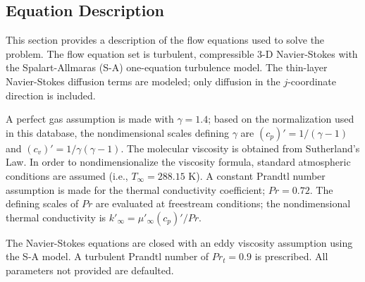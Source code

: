 \subsection{Equation Description}

This section provides a description of the flow equations used to solve
the problem.  The flow equation set is turbulent, compressible 3-D
Navier-Stokes with the Spalart-Allmaras (S-A) one-equation turbulence
model.  The thin-layer Navier-Stokes diffusion terms are modeled; only
diffusion in the $j$-coordinate direction is included.

A perfect gas assumption is made with $\gamma = 1.4$; based on the
normalization used in this database, the nondimensional scales defining
$\gamma$ are $(c_p)' = 1/(\gamma - 1)$ and $(c_v)' = 1/\gamma(\gamma - 1)$.
The molecular viscosity is obtained from Sutherland's Law.
In order to nondimensionalize the viscosity formula, standard atmospheric
conditions are assumed (i.e., $T_\infty = 288.15$ K).
A constant Prandtl number assumption is made for the thermal conductivity
coefficient; $Pr = 0.72$.
The defining scales of $Pr$ are evaluated at freestream conditions; the
nondimensional thermal conductivity is $k'_\infty = \mu'_\infty (c_p)' / Pr$.

The Navier-Stokes equations are closed with an eddy viscosity assumption 
using the S-A model.
A turbulent Prandtl number of $Pr_t = 0.9$ is prescribed.
All parameters not provided are defaulted.

